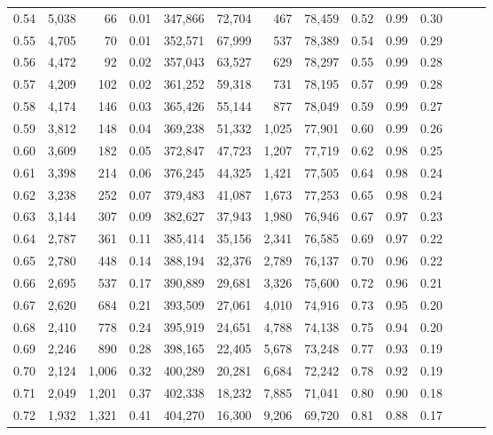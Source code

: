 \begin{tabular}{rrrrrrrrrrrrrr}
0.54 &  5,038 &     66 &  0.01 &  347,866 &   72,704 &     467 &  78,459 &  0.52 &  0.99 &      0.30 \\
0.55 &  4,705 &     70 &  0.01 &  352,571 &   67,999 &     537 &  78,389 &  0.54 &  0.99 &      0.29 \\
0.56 &  4,472 &     92 &  0.02 &  357,043 &   63,527 &     629 &  78,297 &  0.55 &  0.99 &      0.28 \\
0.57 &  4,209 &    102 &  0.02 &  361,252 &   59,318 &     731 &  78,195 &  0.57 &  0.99 &      0.28 \\
0.58 &  4,174 &    146 &  0.03 &  365,426 &   55,144 &     877 &  78,049 &  0.59 &  0.99 &      0.27 \\
0.59 &  3,812 &    148 &  0.04 &  369,238 &   51,332 &   1,025 &  77,901 &  0.60 &  0.99 &      0.26 \\
0.60 &  3,609 &    182 &  0.05 &  372,847 &   47,723 &   1,207 &  77,719 &  0.62 &  0.98 &      0.25 \\
0.61 &  3,398 &    214 &  0.06 &  376,245 &   44,325 &   1,421 &  77,505 &  0.64 &  0.98 &      0.24 \\
0.62 &  3,238 &    252 &  0.07 &  379,483 &   41,087 &   1,673 &  77,253 &  0.65 &  0.98 &      0.24 \\
0.63 &  3,144 &    307 &  0.09 &  382,627 &   37,943 &   1,980 &  76,946 &  0.67 &  0.97 &      0.23 \\
0.64 &  2,787 &    361 &  0.11 &  385,414 &   35,156 &   2,341 &  76,585 &  0.69 &  0.97 &      0.22 \\
0.65 &  2,780 &    448 &  0.14 &  388,194 &   32,376 &   2,789 &  76,137 &  0.70 &  0.96 &      0.22 \\
0.66 &  2,695 &    537 &  0.17 &  390,889 &   29,681 &   3,326 &  75,600 &  0.72 &  0.96 &      0.21 \\
0.67 &  2,620 &    684 &  0.21 &  393,509 &   27,061 &   4,010 &  74,916 &  0.73 &  0.95 &      0.20 \\
0.68 &  2,410 &    778 &  0.24 &  395,919 &   24,651 &   4,788 &  74,138 &  0.75 &  0.94 &      0.20 \\
0.69 &  2,246 &    890 &  0.28 &  398,165 &   22,405 &   5,678 &  73,248 &  0.77 &  0.93 &      0.19 \\
0.70 &  2,124 &  1,006 &  0.32 &  400,289 &   20,281 &   6,684 &  72,242 &  0.78 &  0.92 &      0.19 \\
0.71 &  2,049 &  1,201 &  0.37 &  402,338 &   18,232 &   7,885 &  71,041 &  0.80 &  0.90 &      0.18 \\
0.72 &  1,932 &  1,321 &  0.41 &  404,270 &   16,300 &   9,206 &  69,720 &  0.81 &  0.88 &      0.17 \\

\end{tabular}
